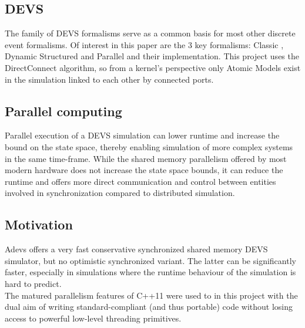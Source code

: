 \subsection{DEVS}
The family of DEVS \cite{DEVSbase} formalisms serve as a common basis for most other discrete event formalisms. Of interest in this paper are the 3 key formalisms: Classic \cite{ClassicDEVS}, Dynamic Structured \cite{DSDEVS} and Parallel \cite{ParallelDEVS} and their implementation. This project uses the DirectConnect \cite{SymbolicFlattening} algorithm, so from a kernel's perspective only Atomic Models exist in the simulation linked to each other by connected ports.

\subsection{Parallel computing}
Parallel execution of a DEVS simulation can lower runtime and increase the bound on the state space, thereby enabling simulation of more complex systems in the same time-frame.
While the shared memory parallelism offered by most modern hardware does not increase the state space bounds, it can reduce the runtime and offers more direct communication and control between entities involved in synchronization compared to distributed simulation. \\

\subsection{Motivation}
Adevs \cite{adevs} offers a very fast conservative synchronized shared memory DEVS simulator, but no optimistic synchronized variant. 
The latter can be significantly faster, especially in simulations where the runtime behaviour of the simulation is hard to predict. \\
The matured parallelism features of C++11 were used to in this project with the dual aim of writing standard-compliant (and thus portable) code without losing access to powerful low-level threading primitives. %

